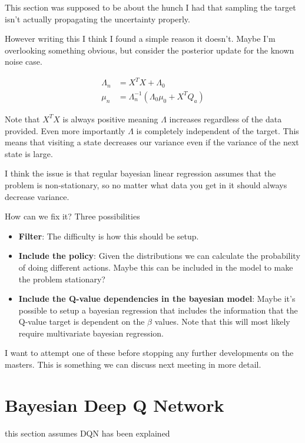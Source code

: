 This section was supposed to be about the hunch I had that sampling the target isn't actually propagating the uncertainty properly. 

However writing this I think I found a simple reason it doesn't. Maybe I'm overlooking something obvious, but consider the posterior update for the known noise case.

\begin{align}
\Lambda_n & = X^TX + \Lambda_0 \\
\mu_n     & = \Lambda_n^{-1}(\Lambda_0\mu_0 + X^TQ_a)
\end{align}

Note that $X^TX$ is always positive meaning $\Lambda$ increases regardless of the data provided. Even more importantly $\Lambda$ is completely independent of the target. This means that visiting a state decreases our variance even if the variance of the next state is large.

I think the issue is that regular bayesian linear regression assumes that the problem is non-stationary, so no matter what data you get in it should always decrease variance.

How can we fix it? Three possibilities

\begin{itemize}
    \item \textbf{Filter}: The difficulty is how this should be setup.
    \item \textbf{Include the policy}: Given the distributions we can calculate the probability of doing different actions. Maybe this can be included in the model to make the problem stationary? 
    \item \textbf{Include the Q-value dependencies in the bayesian model}: Maybe it's possible to setup a bayesian regression that includes the information that the Q-value target is dependent on the $\beta$ values. Note that this will most likely require multivariate bayesian regression.
\end{itemize}

I want to attempt one of these before stopping any further developments on the masters. This is something we can discuss next meeting in more detail.

\section{Bayesian Deep Q Network}

\todo this section assumes DQN has been explained

